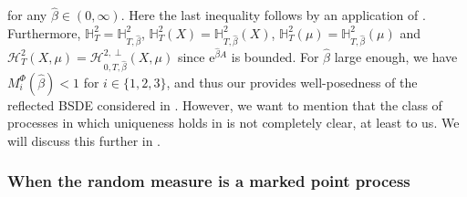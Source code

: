 \documentclass[10pt]{article} %
\newcommand\cH{\mathcal H}
\def \H{\mathbb{H}}
\begin{document}
for any $\hat\beta \in (0,\infty)$. Here the last inequality follows by an application of . Furthermore, $\H^2_{T} = \H^2_{T,\hat\beta}$, $\H^2_{T}(X) = \H^2_{T,\hat\beta}(X)$, $\H^2_{T}(\mu) = \H^2_{T,\hat\beta}(\mu)$ and $\cH^2_{T}(X,\mu) = \cH^{2,\perp}_{0,T,\hat\beta}(X,\mu)$ since $\mathrm{e}^{\hat\beta A}$ is bounded. For $\hat\beta$ large enough, we have $M^\Phi_i(\hat\beta) < 1$ for $i \in \{1,2,3\}$, and thus our  provides well-posedness of the reflected BSDE considered in \cite{grigorova2017reflected,grigorova2020optimal}. However, we want to mention that the class of processes in which uniqueness holds in \cite{grigorova2020optimal} is not completely clear, at least to us. We will discuss this further in . 




\subsubsection{When the random measure is a marked point process}
\end{document}
